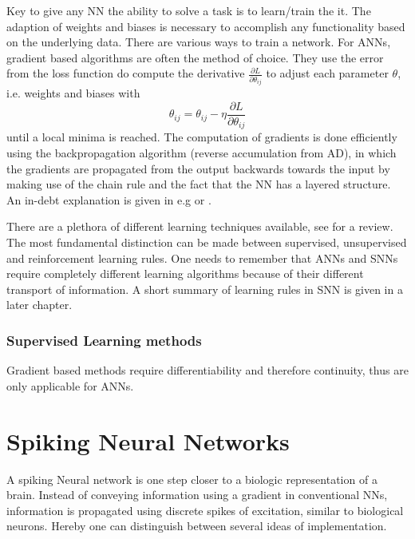  Key to give any \ac{NN} the ability to solve a task is to learn/train the it. The adaption of weights and biases is necessary to accomplish any functionality based on the underlying data\cite{zheng_introductory_2022}. There are various ways to train a network. For \acp{ANN}, gradient based algorithms are often the method of choice. They use the error from the loss function do compute the derivative $\frac{\partial L}{\partial \theta_{ij}}$ to adjust each parameter $\theta$, i.e. weights and biases with
 \begin{equation}
 	\theta_{ij} = \theta_{ij} - \eta \frac{\partial L}{\partial \theta_{ij}}
 \end{equation}
 until a local minima is reached. The computation of gradients is done efficiently using the backpropagation algorithm (reverse accumulation from \ac{AD}), in which the gradients are propagated from the output backwards towards the input by making use of the chain rule and the fact that the \ac{NN} has a layered structure. An in-debt explanation is given in e.g \cite{goodfellow_deep_2016} or \cite{nielsen_neural_2015}.


 There are a plethora of different learning techniques available, see \cite{abdolrasol_artificial_2021}\cite{sun_survey_2019} for a review. The most fundamental distinction can be made between supervised, unsupervised and reinforcement learning rules.
 One needs to remember that \acp{ANN} and \acp{SNN} require completely different learning algorithms because of their different transport of information. A short summary of learning rules in \ac{SNN} is given in a later chapter.\\

 \subsubsection{Supervised Learning methods}
 Gradient based methods require differentiability and therefore continuity, thus are only applicable for \acp{ANN}.\\


\section{Spiking Neural Networks}
A spiking Neural network is one step closer to a biologic representation of a brain. Instead of conveying information using a gradient in conventional \ac{NN}s, information is propagated using discrete spikes of excitation, similar to biological neurons. Hereby one can distinguish between several ideas of implementation.

